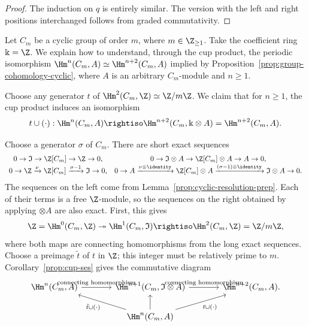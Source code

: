 \begin{proof}
	The induction on $q$ is entirely similar. The version with the left and
	right positions interchanged follows from graded commutativity.
\end{proof}

\begin{example}\label{eg:cup-periodicity}
	Let $C_m$ be a cyclic group of order $m$, where
	$m\in\Z_{\geq1}$. Take the coefficient ring $\Bbbk=\Z$. We explain how to
	understand, through the cup product, the periodic isomorphism
	$\Hm^n(C_m,A)\simeq\Hm^{n+2}(C_m,A)$ implied by
	Proposition~\ref{prop:group-cohomology-cyclic}, where $A$ is an arbitrary
	$C_m$-module and $n\geq1$.

	Choose any generator $t$ of $\Hm^2(C_m,\Z)\simeq\Z/m\Z$. We claim that
	for $n\geq1$, the cup product induces an isomorphism
	\[ t \cup (\cdot): \Hm^n(C_m, A) \rightiso \Hm^{n+2}(C_m, \Bbbk \otimes A) = \Hm^{n+2}(C_m, A). \]

	Choose a generator $\sigma$ of $C_m$. There are short exact sequences
	\[\begin{array}{cc}
		0 \to \mathfrak{I} \to \Z[C_m] \to \Z \to 0, & 0 \to \mathfrak{I} \otimes A \to \Z[C_m] \otimes A \to A \to 0, \\
		0 \to \Z \xrightarrow{\nu} \Z[C_m] \xrightarrow{\sigma - 1} \mathfrak{I} \to 0, & 0 \to A \xrightarrow{\nu \otimes \identity} \Z[C_m] \otimes A \xrightarrow{(\sigma-1) \otimes \identity} \mathfrak{I} \otimes A \to 0.
	\end{array}\]
	The sequences on the left come from
	Lemma~\ref{prop:cyclic-resolution-prep}. Each of their terms is a free
	$\Z$-module, so the sequences on the right obtained by applying
	$\otimes A$ are also exact. First, this gives
	\[ \Z = \Hm^0(C_m, \Z) \twoheadrightarrow \Hm^1(C_m, \mathfrak{I}) \rightiso \Hm^2(C_m, \Z) = \Z/m\Z, \]
	where both maps are connecting homomorphisms from the long exact
	sequences. Choose a preimage $\tilde{t}$ of $t$ in $\Z$; this integer must
	be relatively prime to $m$. Corollary~\ref{prop:cup-ses} gives the
	commutative diagram
	\[\begin{tikzcd}[column sep=large]
		\Hm^n(C_m, A) \arrow[r, "\text{connecting homomorphism}"] & \Hm^{n+1}(C_m, \mathfrak{I} \otimes A) \arrow[r, "\text{connecting homomorphism}"] & \Hm^{n+2}(C_m, A). \\
		& \Hm^n(C_m, A) \arrow[lu, "{\tilde{t} \cup (\cdot)}"] \arrow[u] \arrow[ru, "{t \cup (\cdot)}"'] &
	\end{tikzcd}\]


\end{example}
